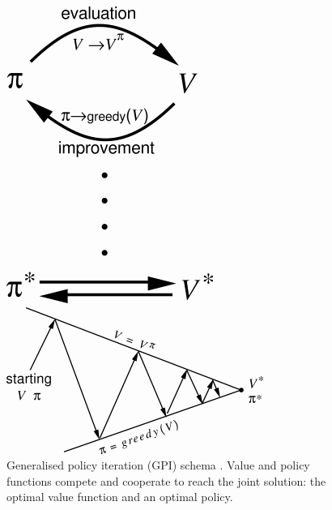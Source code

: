 \begin{figure}[!h]
	\centering
	\begin{minipage}[b]{0.25\textwidth}
		\includegraphics[width=\textwidth]{img/gpi00.png}
	\end{minipage}
	\begin{minipage}[b]{0.55\textwidth}
		\includegraphics[width=\textwidth]{img/gpi01.png}
	\end{minipage}
	\caption[Generalised Policy Iteration (GPI) schema]{ Generalised policy iteration (GPI) schema \cite{sutton2018reinforcement}.
		Value and policy functions compete and cooperate to reach the joint solution: the optimal value function and an optimal policy.}
	\label{fig:gpi}
\end{figure}

